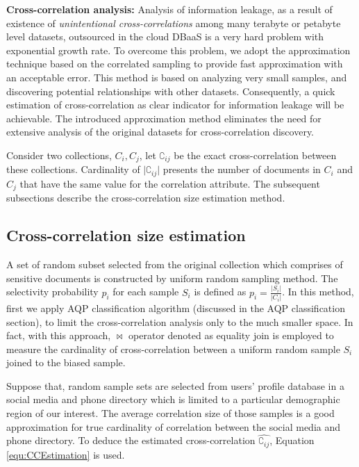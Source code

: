 \noindent \textbf{ Cross-correlation analysis:} Analysis of information leakage, as a result of existence of \emph{unintentional cross-correlations} among many terabyte or petabyte level datasets, outsourced in the cloud DBaaS is a very hard problem with exponential growth rate. To overcome this problem, we adopt the approximation technique based on the correlated sampling to provide fast approximation with an acceptable error. This method is based on analyzing very small samples, and discovering potential relationships with other datasets. Consequently, a quick estimation of cross-correlation as clear indicator for information leakage will be achievable. The introduced approximation method eliminates the need for extensive analysis of the original datasets for cross-correlation discovery.

Consider two collections, $C_i, C_j$, let $\complement_{ij}$ be the exact cross-correlation between these collections. Cardinality of $\vert\complement_{ij}\vert$ presents the number of documents in $C_i$ and $C_j$ that have the same value for the correlation attribute. The subsequent subsections describe the cross-correlation size estimation method. 

\subsection{Cross-correlation size estimation}
\label{correlatedEstimationSubSection}

A set of random subset selected from the original collection which comprises of sensitive documents is constructed by uniform random sampling method. The selectivity probability $p_i$ for each sample $S_i$ is defined as $p_i=\frac{\vert S_i\vert}{\vert C_{i}\vert}$. In this method, first we apply AQP classification algorithm (discussed in the AQP classification section), to limit the cross-correlation analysis only to the much smaller space. In fact, with this approach, $\bowtie$ operator denoted as equality join is employed to measure the cardinality of cross-correlation between a uniform random sample $S_i$ joined to the biased sample. 

Suppose that, random sample sets are selected from users' profile database in a social media and phone directory which is limited to a particular demographic region of our interest. The average correlation size of those samples is a good approximation for true cardinality of correlation between the social media and phone directory. To deduce the estimated cross-correlation $\hat{\complement_{ij}}$,  Equation \ref{equ:CCEstimation} is used.

